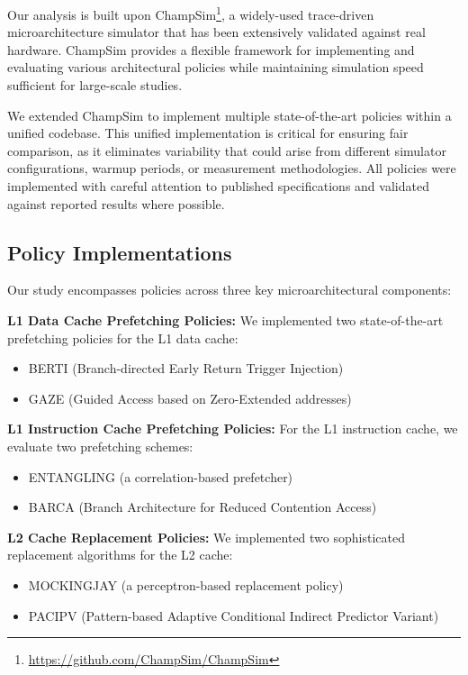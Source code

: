 \documentclass[conference]{IEEEtran}
\begin{document}
Our analysis is built upon ChampSim\footnote{\url{https://github.com/ChampSim/ChampSim}}, a widely-used trace-driven microarchitecture simulator that has been extensively validated against real hardware. ChampSim provides a flexible framework for implementing and evaluating various architectural policies while maintaining simulation speed sufficient for large-scale studies.

We extended ChampSim to implement multiple state-of-the-art policies within a unified codebase. This unified implementation is critical for ensuring fair comparison, as it eliminates variability that could arise from different simulator configurations, warmup periods, or measurement methodologies. All policies were implemented with careful attention to published specifications and validated against reported results where possible.

\subsection{Policy Implementations}

Our study encompasses policies across three key microarchitectural components:

\textbf{L1 Data Cache Prefetching Policies:}
We implemented two state-of-the-art prefetching policies for the L1 data cache:
\begin{itemize}
\item BERTI (Branch-directed Early Return Trigger Injection)
\item GAZE (Guided Access based on Zero-Extended addresses)
\end{itemize}

\textbf{L1 Instruction Cache Prefetching Policies:}
For the L1 instruction cache, we evaluate two prefetching schemes:
\begin{itemize}
\item ENTANGLING (a correlation-based prefetcher)
\item BARCA (Branch Architecture for Reduced Contention Access)
\end{itemize}

\textbf{L2 Cache Replacement Policies:}
We implemented two sophisticated replacement algorithms for the L2 cache:
\begin{itemize}
\item MOCKINGJAY (a perceptron-based replacement policy)
\item PACIPV (Pattern-based Adaptive Conditional Indirect Predictor Variant)
\end{itemize}
\end{document}
